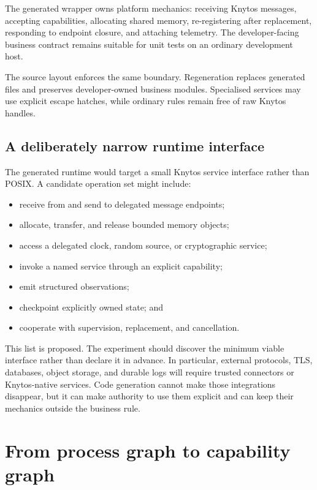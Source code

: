 The generated wrapper owns platform mechanics: receiving Knytos messages,
accepting capabilities, allocating shared memory, re-registering after
replacement, responding to endpoint closure, and attaching telemetry. The
developer-facing business contract remains suitable for unit tests on an
ordinary development host.

The source layout enforces the same boundary. Regeneration replaces generated
files and preserves developer-owned business modules. Specialised services may
use explicit escape hatches, while ordinary rules remain free of raw Knytos
handles.

\subsection{A deliberately narrow runtime interface}

The generated runtime would target a small Knytos service interface rather
than POSIX. A candidate operation set might include:

\begin{itemize}
    \item receive from and send to delegated message endpoints;
    \item allocate, transfer, and release bounded memory objects;
    \item access a delegated clock, random source, or cryptographic service;
    \item invoke a named service through an explicit capability;
    \item emit structured observations;
    \item checkpoint explicitly owned state; and
    \item cooperate with supervision, replacement, and cancellation.
\end{itemize}

This list is proposed. The experiment should discover the minimum viable
interface rather than declare it in advance. In particular, external protocols,
TLS, databases, object storage, and durable logs will require trusted connectors
or Knytos-native services. Code generation cannot make those integrations
disappear, but it can make authority to use them explicit and can keep their
mechanics outside the business rule.

\section{From process graph to capability graph}

